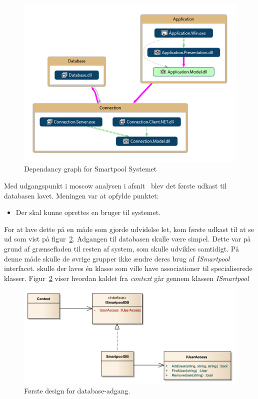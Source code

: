  


\begin{figure}[h]
\centering
\includegraphics[width=0.5\linewidth]{figs/design/vs_codeMap.PNG}
\caption{Dependancy graph for Smartpool Systemet}
\label{fig:vs_codeMap}
\end{figure}


Med udgangspunkt i \gls{moscow} analysen i afsnit~\pageref{sec:moscow} blev det første udkast til databasen lavet. Meningen var at opfylde punktet: 

\begin{itemize}
	\item Der skal kunne oprettes en bruger til systemet.
\end{itemize}

For at lave dette på en måde som gjorde udvidelse let, kom første udkast til at se ud som vist på figur~\ref{fig:database_class_1}. Adgangen til databasen skulle være simpel. Dette var på grund af grænsefladen til resten af system, som skulle udvikles samtidigt. På denne måde skulle de øvrige grupper ikke ændre deres brug af \textit{ISmartpool} interfacet.  skulle der laves én klasse som ville have associationer til specialiserede klasser. Figur~\ref{fig:database_class_1} viser hvordan kaldet fra \textit{context} går gennem klassen \textit{ISmartpool}

\begin{figure}[h]
	\centering
	\includegraphics[width=0.9\linewidth]{figs/design/database_class_1}
	\caption{Første design for database-adgang.}
	\label{fig:database_class_1}
\end{figure}

